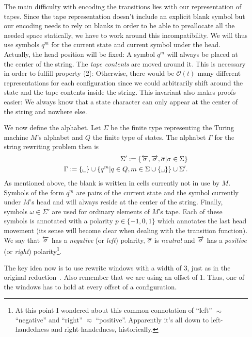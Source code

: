 \documentclass[a4paper,UKenglish,cleveref, autoref]{lipics-v2019}
\newcommand{\bigO}[1]{\mathcal{O}{(#1)}}
\begin{document}
The main difficulty with encoding the transitions lies with our representation of tapes. Since the tape representation doesn't include an explicit blank symbol but our encoding needs to rely on blanks in order to be able to preallocate all the needed space statically, we have to work around this incompatibility. We will thus use symbols $q^m$ for the current state and current symbol under the head. 
Actually, the head position will be fixed: A symbol $q^m$ will always be placed at the center of the string. The \emph{tape contents} are moved around it. This is necessary in order to fulfill property (2): Otherwise, there would be $\bigO{t}$ many different representations for each configuration since we could arbitrarily shift around the state and the tape contents inside the string.
This invariant also makes proofs easier: We always know that a state character can only appear at the center of the string and nowhere else.

We now define the alphabet.
Let $\Sigma$ be the finite type representing the Turing machine $M$'s alphabet and $Q$ the finite type of states. The alphabet $\Gamma$ for the string rewriting problem then is 
\begin{align*}
  \Sigma' := \{\polneg{\sigma}, \polpos{\sigma}, \polneut{\sigma} | \sigma \in \Sigma\} \\
  \Gamma := \{\blank\} \cup \{q^m | q \in Q, m \in \Sigma \cup \{\blank\}\} \cup \Sigma'. 
\end{align*}
As mentioned above, the blank \blank{} is written in cells currently not in use by $M$. Symbols of the form $q^m$ are pairs of the current state and the symbol currently under $M$'s head and will always reside at the center of the string.
Finally, symbols $\omega \in \Sigma'$ are used for ordinary elements of $M$'s tape. Each of these symbols is annotated with a polarity $p \in \{-1, 0, 1\}$ which annotates the last head movement (its sense will become clear when dealing with the transition function). We say that $\overleftarrow{\sigma}$ has a \emph{negative} (or \emph{left}) polarity, $\overline{\sigma}$ is \emph{neutral} and $\overrightarrow{\sigma}$ has a \emph{positive} (or \emph{right}) polarity\footnote{At this point I wondered about this common connotation of ``left'' $\eqsim$ ``negative'' and ``right'' $\eqsim$ ``positive''. Apparently it's all down to left-handedness and right-handedness, historically.}. 

The key idea now is to use rewrite windows with a width of 3, just as in the original reduction~\cite{Sipser:TheoryofComputation}. Also remember that we are using an offset of 1. Thus, one of the windows has to hold at every offset of a configuration. 
\end{document}
